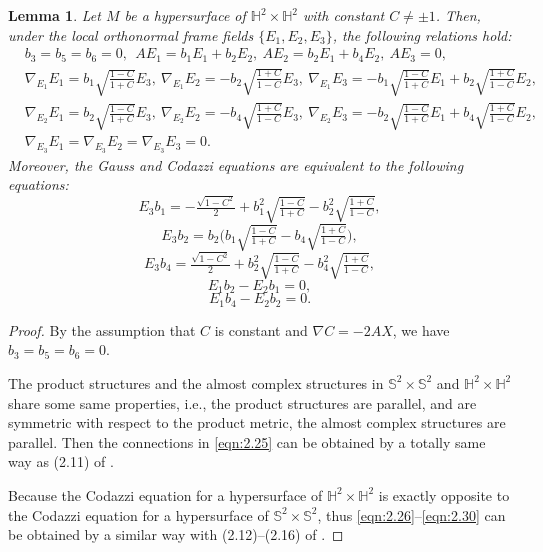 \documentclass[reqno]{amsart}%
\newtheorem{lemma}[theorem]{Lemma}
\theoremstyle{definition}
\numberwithin{equation}{section}
\begin{document}
\begin{lemma}\label{lemma:2.3}
Let $M$ be a hypersurface of $\mathbb{H}^2\times \mathbb{H}^2$ with constant $C\neq\pm1$.
Then, under the local orthonormal frame fields $\{E_1, E_2, E_3\}$,
the following relations hold:
\begin{equation}\label{eqn:2.25}
\begin{aligned}
&b_3=b_5=b_6=0, \ \ A E_1=b_1 E_1+b_2 E_2,\ A E_2=b_2 E_1+b_4 E_2,\ A E_3=0,\\		
&\nabla_{E_1}E_1=b_1\sqrt{\tfrac{1-C}{1+C}}E_3,\
\nabla_{E_1}E_2=-b_2\sqrt{\tfrac{1+C}{1-C}}E_3,\ \nabla_{E_1}E_3=-b_1\sqrt{\tfrac{1-C}{1+C}}E_1
+b_2\sqrt{\tfrac{1+C}{1-C}}E_2,\\
&\nabla_{E_2} E_1=b_2\sqrt{\tfrac{1-C}{1+C}}E_3,\
\nabla_{E_2} E_2=-b_4\sqrt{\tfrac{1+C}{1-C}}E_3,\ \nabla_{E_2}E_3=-b_2\sqrt{\tfrac{1-C}{1+C}}E_1
+b_4\sqrt{\tfrac{1+C}{1-C}}E_2,\\
&\nabla_{E_3}E_1=\nabla_{E_3}E_2=\nabla_{E_3}E_3=0.
\end{aligned}
\end{equation}
Moreover, the Gauss and Codazzi equations are equivalent to the following equations:
\begin{equation}\label{eqn:2.26}
E_3b_1=-\tfrac{\sqrt{1-C^2}}{2}+b_1^{2}\sqrt{\tfrac{1-C}{1+C}}-b_2^2\sqrt{\tfrac{1+C}{1-C}},
\end{equation}
%
\begin{equation}\label{eqn:2.27}
E_3b_2=b_2\big(b_1\sqrt{\tfrac{1-C}{1+C}}-b_4\sqrt{\tfrac{1+C}{1-C}}\big),
\end{equation}
%
\begin{equation}\label{eqn:2.28}
E_3b_4=\tfrac{\sqrt{1-C^2}}{2}+b_2^{2}\sqrt{\tfrac{1-C}{1+C}}-b_4^2\sqrt{\tfrac{1+C}{1-C}},
\end{equation}
%
\begin{equation}\label{eqn:2.29}
E_1b_2-E_2b_1=0,	
\end{equation}
%
\begin{equation}\label{eqn:2.30}
E_1b_4-E_2b_2=0.
\end{equation}
\end{lemma}
%
\begin{proof}
By the assumption that $C$ is constant and $\nabla C=-2 AX$, we have $b_3=b_5=b_6=0$.

The product structures and the almost complex structures in
$\mathbb{S}^2\times\mathbb{S}^2$ and $\mathbb{H}^2\times\mathbb{H}^2$ share some same
properties, i.e., the product structures are parallel, and are symmetric with respect to the
product metric, the almost complex structures are parallel. Then the connections in \eqref{eqn:2.25}
can be obtained by a totally same way as (2.11) of \cite{LVWY}.

Because the Codazzi equation for a hypersurface of $\mathbb{H}^2\times\mathbb{H}^2$ 
is exactly opposite to the Codazzi equation for a hypersurface of $\mathbb{S}^2\times\mathbb{S}^2$, 
thus \eqref{eqn:2.26}--\eqref{eqn:2.30} can be obtained by a similar way with
(2.12)--(2.16) of \cite{LVWY}.
\end{proof}
\end{document}
